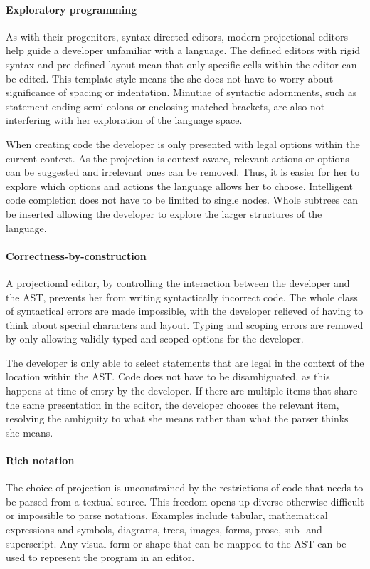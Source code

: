  
\paragraph{Exploratory programming}
As with their progenitors, syntax-directed editors, modern projectional editors help guide a developer unfamiliar with a language.
The defined editors with rigid syntax and pre-defined layout mean that only specific cells within the editor can be edited.
This template style means the she does not have to worry about significance of spacing or indentation.
Minutiae of syntactic adornments, such as statement ending semi-colons or enclosing matched brackets, are also not interfering with her exploration of the language space.

When creating code the developer is only presented with legal options within the current context.
As the projection is context aware, relevant actions or options can be suggested and irrelevant ones can be removed.
Thus, it is easier for her to explore which options and actions the language allows her to choose.
Intelligent code completion does not have to be limited to single nodes. 
Whole subtrees can be inserted allowing the developer to explore the larger structures of the language.

\paragraph{Correctness-by-construction}
A projectional editor, by controlling the interaction between the developer and the AST, prevents her from writing syntactically incorrect code.
The whole class of syntactical errors are made impossible, with the developer relieved of having to think about special characters and layout.
Typing and scoping errors are removed by only allowing validly typed and scoped options for the developer.

The developer is only able to select statements that are legal in the context of the location within the AST.
Code does not have to be disambiguated, as this happens at time of entry by the developer.
If there are multiple items that share the same presentation in the editor, the developer chooses the relevant item, resolving the ambiguity to what she means rather than what the parser thinks she means.

\paragraph{Rich notation}
The choice of projection is unconstrained by the restrictions of code that needs to be parsed from a textual source.
This freedom opens up diverse otherwise difficult or impossible to parse notations.
Examples include tabular, mathematical expressions and symbols, diagrams, trees, images, forms, prose, sub- and superscript.
Any visual form or shape that can be mapped to the AST can be used to represent the program in an editor.

